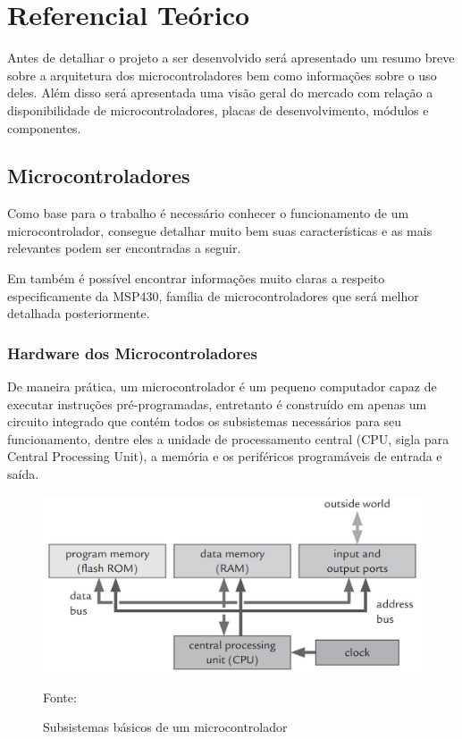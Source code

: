 \chapter[Referencial Teórico]{Referencial Teórico}

Antes de detalhar o projeto a ser desenvolvido será apresentado um resumo breve sobre a arquitetura dos microcontroladores bem como informações sobre o uso deles.   Além disso será apresentada uma visão geral do mercado com relação a disponibilidade de microcontroladores, placas de desenvolvimento, módulos e componentes.

\section[Microcontroladores]{Microcontroladores}

Como base para o trabalho é necessário conhecer o funcionamento de um microcontrolador,  consegue detalhar muito bem suas características e as mais relevantes podem ser encontradas a seguir.

Em  também é possível encontrar informações muito claras a respeito especificamente da MSP430, família de microcontroladores que será melhor detalhada posteriormente.

\subsection{Hardware dos Microcontroladores}

De maneira prática, um microcontrolador é um pequeno computador capaz de executar instruções pré-programadas, entretanto é construído em apenas um circuito integrado que contém todos os subsistemas necessários para seu funcionamento, dentre eles a unidade de processamento central (CPU, sigla para Central Processing Unit), a memória e os periféricos programáveis de entrada e saída.

\begin{figure}[h!]
  \centering
  \includegraphics[width=0.9\linewidth]{figuras/componentes-microcontrolador.png}
  \caption{Subsistemas básicos de um microcontrolador} Fonte: \cite{Basics2008}
  \label{fig:arq_micro}
\end{figure}


